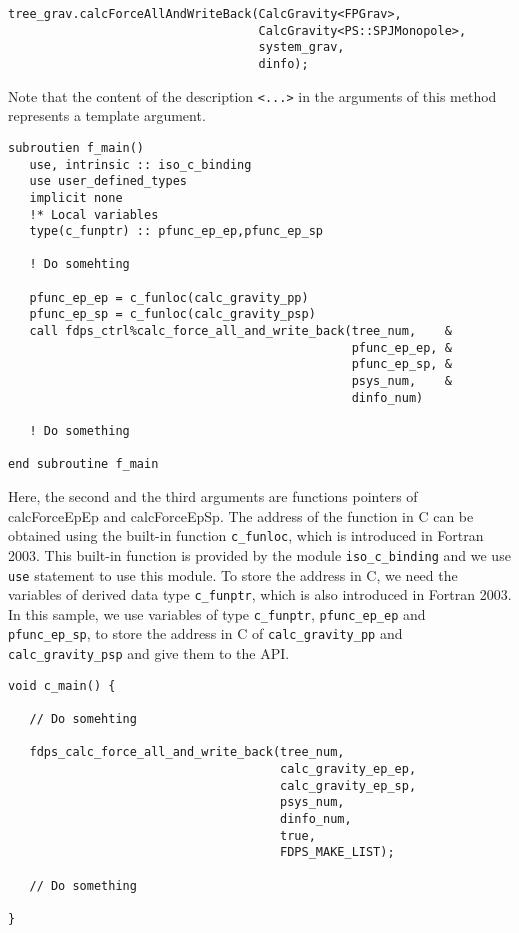 \ifCpp %
\begin{lstlisting}[caption=Interaction Calculation]
tree_grav.calcForceAllAndWriteBack(CalcGravity<FPGrav>,
                                   CalcGravity<PS::SPJMonopole>,
                                   system_grav,
                                   dinfo);
\end{lstlisting}
Note that the content of the description \texttt{<...>} in the arguments of this method represents a template argument.
\endifCpp
\ifFtn %
\begin{lstlisting}[caption=Interaction Calculation]
subroutien f_main()
   use, intrinsic :: iso_c_binding
   use user_defined_types
   implicit none
   !* Local variables
   type(c_funptr) :: pfunc_ep_ep,pfunc_ep_sp
   
   ! Do somehting
   
   pfunc_ep_ep = c_funloc(calc_gravity_pp)
   pfunc_ep_sp = c_funloc(calc_gravity_psp)
   call fdps_ctrl%calc_force_all_and_write_back(tree_num,    &
                                                pfunc_ep_ep, &
                                                pfunc_ep_sp, &
                                                psys_num,    &
                                                dinfo_num)

   ! Do something

end subroutine f_main
\end{lstlisting}
Here, the second and the third arguments are functions pointers of \textsf{calcForceEpEp} and \textsf{calcForceEpSp}. The address of the function in C can be obtained using the built-in function \texttt{c\_funloc}, which is introduced in Fortran 2003. This built-in function is provided by the module \texttt{iso\_c\_binding} and we use \texttt{use} statement to use this module. To store the address in C, we need the variables of derived data type \texttt{c\_funptr}, which is also introduced in Fortran 2003. In this sample, we use variables of type \texttt{c\_funptr}, \texttt{pfunc\_ep\_ep} and \texttt{pfunc\_ep\_sp}, to store the address in C of \texttt{calc\_gravity\_pp} and \texttt{calc\_gravity\_psp} and give them to the API.
\endifFtn
\ifC %
\begin{lstlisting}[caption=Interaction Calculation]
void c_main() {
   
   // Do somehting
   
   fdps_calc_force_all_and_write_back(tree_num,
                                      calc_gravity_ep_ep,
                                      calc_gravity_ep_sp,
                                      psys_num,
                                      dinfo_num,
                                      true,
                                      FDPS_MAKE_LIST);

   // Do something

}
\end{lstlisting}
